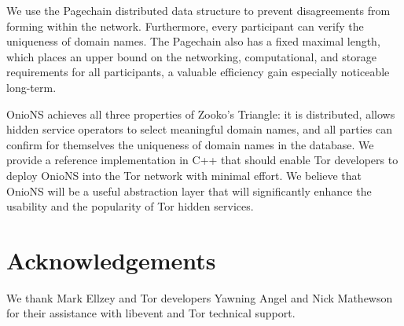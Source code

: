 \documentclass{sig-alternate}
\begin{document}
We use the Pagechain distributed data structure to prevent disagreements from forming within the network. Furthermore, every participant can verify the uniqueness of domain names. The Pagechain also has a fixed maximal length, which places an upper bound on the networking, computational, and storage requirements for all participants, a valuable efficiency gain especially noticeable long-term.

OnioNS achieves all three properties of Zooko's Triangle: it is distributed, allows hidden service operators to select meaningful domain names, and all parties can confirm for themselves the uniqueness of domain names in the database. We provide a reference implementation in C++ that should enable Tor developers to deploy OnioNS into the Tor network with minimal effort. We believe that OnioNS will be a useful abstraction layer that will significantly enhance the usability and the popularity of Tor hidden services. 

\section{Acknowledgements}

We thank Mark Ellzey and Tor developers Yawning Angel and Nick Mathewson for their assistance with libevent and Tor technical support.
\end{document}
